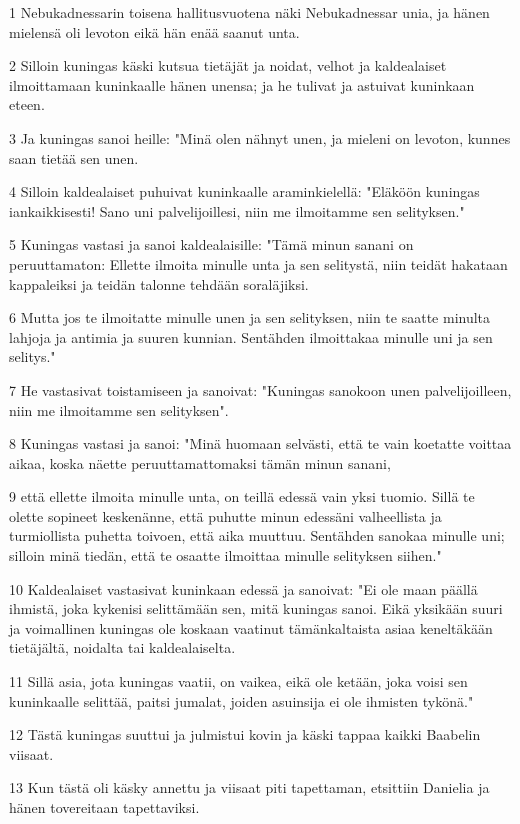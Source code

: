 \par 1 Nebukadnessarin toisena hallitusvuotena näki Nebukadnessar unia, ja hänen mielensä oli levoton eikä hän enää saanut unta.
\par 2 Silloin kuningas käski kutsua tietäjät ja noidat, velhot ja kaldealaiset ilmoittamaan kuninkaalle hänen unensa; ja he tulivat ja astuivat kuninkaan eteen.
\par 3 Ja kuningas sanoi heille: "Minä olen nähnyt unen, ja mieleni on levoton, kunnes saan tietää sen unen.
\par 4 Silloin kaldealaiset puhuivat kuninkaalle araminkielellä: "Eläköön kuningas iankaikkisesti! Sano uni palvelijoillesi, niin me ilmoitamme sen selityksen."
\par 5 Kuningas vastasi ja sanoi kaldealaisille: "Tämä minun sanani on peruuttamaton: Ellette ilmoita minulle unta ja sen selitystä, niin teidät hakataan kappaleiksi ja teidän talonne tehdään soraläjiksi.
\par 6 Mutta jos te ilmoitatte minulle unen ja sen selityksen, niin te saatte minulta lahjoja ja antimia ja suuren kunnian. Sentähden ilmoittakaa minulle uni ja sen selitys."
\par 7 He vastasivat toistamiseen ja sanoivat: "Kuningas sanokoon unen palvelijoilleen, niin me ilmoitamme sen selityksen".
\par 8 Kuningas vastasi ja sanoi: "Minä huomaan selvästi, että te vain koetatte voittaa aikaa, koska näette peruuttamattomaksi tämän minun sanani,
\par 9 että ellette ilmoita minulle unta, on teillä edessä vain yksi tuomio. Sillä te olette sopineet keskenänne, että puhutte minun edessäni valheellista ja turmiollista puhetta toivoen, että aika muuttuu. Sentähden sanokaa minulle uni; silloin minä tiedän, että te osaatte ilmoittaa minulle selityksen siihen."
\par 10 Kaldealaiset vastasivat kuninkaan edessä ja sanoivat: "Ei ole maan päällä ihmistä, joka kykenisi selittämään sen, mitä kuningas sanoi. Eikä yksikään suuri ja voimallinen kuningas ole koskaan vaatinut tämänkaltaista asiaa keneltäkään tietäjältä, noidalta tai kaldealaiselta.
\par 11 Sillä asia, jota kuningas vaatii, on vaikea, eikä ole ketään, joka voisi sen kuninkaalle selittää, paitsi jumalat, joiden asuinsija ei ole ihmisten tykönä."
\par 12 Tästä kuningas suuttui ja julmistui kovin ja käski tappaa kaikki Baabelin viisaat.
\par 13 Kun tästä oli käsky annettu ja viisaat piti tapettaman, etsittiin Danielia ja hänen tovereitaan tapettaviksi.

